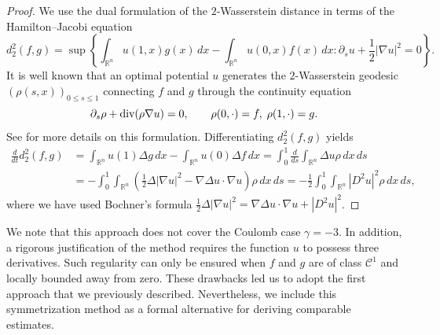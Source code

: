\documentclass[10pt,oneside]{amsart}
\numberwithin{equation}{section}
\numberwithin{definition}{section}
\numberwithin{theorem}{section}
\numberwithin{lemma}{section}
\begin{document}
\begin{proof}
  We use the dual formulation of the $2$-Wasserstein distance in terms of the Hamilton–Jacobi equation
  \begin{equation}\label{eq:HJ_formulation}
    d_{2}^{2}(f,g)=\sup\left\{ \int_{\mathbb R^n} u(1,x)g(x)\,dx-\int_{\mathbb R^n} u(0,x)f(x)\,dx:\partial_{s}u+\frac{1}{2}\left|\nabla u\right|^{2}=0\right\}.
  \end{equation}
  It is well known that an optimal potential $u$ generates the $2$-Wasserstein geodesic
  $(\rho(s,x))_{0\leq s\leq1}$ connecting $f$ and $g$ through the continuity equation
  \begin{equation}\label{eq:CE_heat}
    \partial_s \rho + \textnormal{div}(\rho \nabla u) = 0,\qquad \rho(0,\cdot) = f,\; \rho(1,\cdot) = g.
  \end{equation}
  See \cite{villani2003topicsOT} for more details on this formulation. Differentiating $d_2^2(f,g)$ yields
  \begin{align*}
    \frac{d}{dt}d_2^2(f,g) &
    =\int_{\mathbb{R}^{n}}u(1)\Delta g\,dx-\int_{\mathbb{R}^{n}}u(0)\Delta f\,dx
    =\int_{0}^{1}\frac{d}{ds}\int_{\mathbb{R}^{n}}\Delta u\rho\,dx\,ds \\
    & =-\int_{0}^{1}\int_{\mathbb{R}^{n}}\left(\frac{1}{2}\Delta\left|\nabla u\right|^{2}-\nabla\Delta u\cdot\nabla u\right)\rho\,dx\, ds 
    =-\frac{1}{2}\int_{0}^{1}\int_{\mathbb{R}^{n}}\left|D^{2}u\right|^{2}\rho\,dx\,ds,
  \end{align*}
  where we have used Bochner's formula $\frac{1}{2}\Delta\left|\nabla u\right|^{2}=\nabla\Delta u\cdot\nabla u+\left|D^{2}u\right|^{2}$.
\end{proof}
% 
We note that this approach does not cover the Coulomb case $\gamma = -3$. In addition, a rigorous justification of the method requires the function $u$ to possess three derivatives. Such regularity can only be ensured when $f$ and $g$ are of class $\mathcal{C}^1$ and locally bounded away from zero. These drawbacks led us to adopt the first approach that we previously described. Nevertheless, we include this symmetrization method as a formal alternative for deriving comparable estimates.
\end{document}

